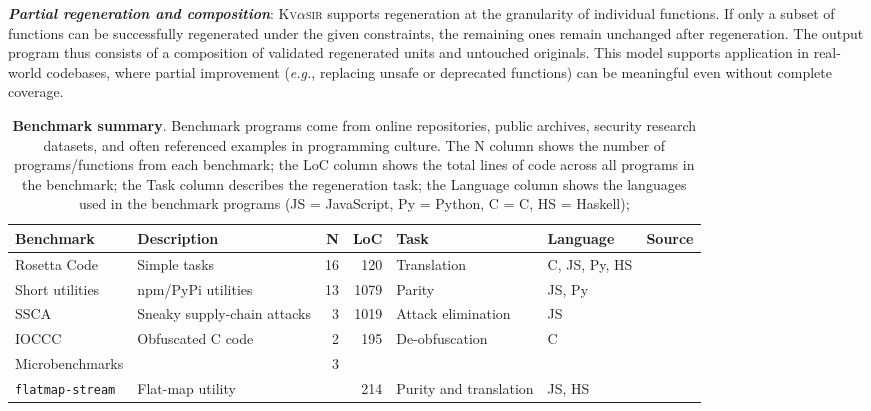 \documentclass[nonacm,sigplan,review]{acmart}
\def\eg{{\em e.g.}, }
\newcommand{\sys}{{\scshape Kv{$\alpha$}sir}\xspace}
\newcommand{\heading}[1]{\vspace{2pt}\noindent\textbf{\emph{#1}}:\enspace}
\newcommand{\ttt}[1]{\texttt{#1}\xspace}
\begin{document}
\heading{Partial regeneration and composition}
\sys supports regeneration at the granularity of individual functions.
If only a subset of functions can be successfully regenerated under the given constraints, the remaining ones remain unchanged after regeneration.
The output program thus consists of a composition of validated regenerated units and untouched originals.
This model supports application in real-world codebases, where partial improvement (\eg replacing unsafe or deprecated functions) can be meaningful even without complete coverage.

\begin{table}[t]
\centering
  \caption{\textbf{Benchmark summary}. 
  Benchmark programs come from online repositories, public archives, security research datasets, and often referenced examples in programming culture.
The N column shows the number of programs/functions from each benchmark;
the LoC column shows the total lines of code across all programs in the benchmark;
the Task column describes the regeneration task;
  the Language column shows the languages used in the benchmark programs (JS = JavaScript, Py = Python, C = C, HS = Haskell);
}
  \begin{tabular*}{\textwidth}{llrrlll}
\toprule
    Benchmark                          & Description                              & N  & LoC & Task               & Language & Source \\
\midrule
Rosetta Code                       & Simple tasks                             & 16 & 120 & Translation            & C, JS, Py, HS & \cite{rosettacode} \\
Short utilities                    & npm/PyPi utilities                       & 13 & 1079& Parity                 & JS, Py & \cite{regbench2025} \\
SSCA                               & Sneaky supply-chain attacks              & 3  & 1019& Attack elimination     & JS & \cite{ev:eurosec:2022, ohm2020backstabber,copeland2019frightening} \\
IOCCC                              & Obfuscated C code                        & 2  & 195 & De-obfuscation         & C & \cite{ioccc} \\
Microbenchmarks                    &                                          & 3  &     &                        & & \\
\hspace{.5em} \ttt{flatmap-stream} & Flat-map utility                         &    & 214 & Purity and translation & JS, HS & \cite{es1}  \\

\end{tabular*}
\end{table}
\end{document}
